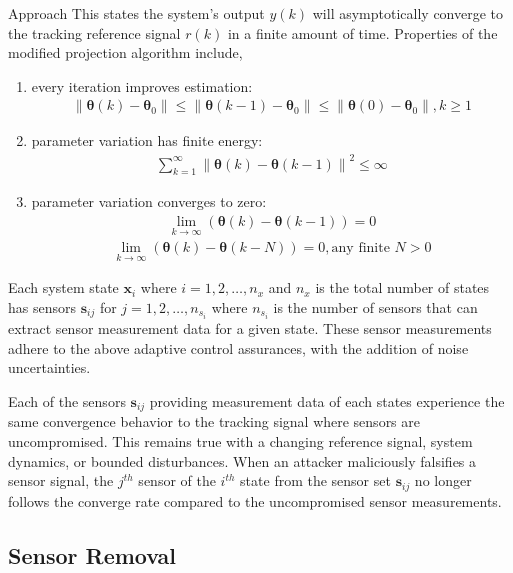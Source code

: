 \begin{section}{Approach}
This states the system's output $y(k)$ will asymptotically converge to the tracking reference signal $r(k)$ in a finite amount of time. Properties of the modified projection algorithm include,
    \begin{enumerate}[label=(\roman*),leftmargin=3\parindent]
	\item every iteration improves estimation:
	    \begin{align}
	        \|\bm{\theta}(k)-\bm{\theta}_0\|\leq\|\bm{\theta}(k-1)-\bm{\theta}_0\|\leq\|\bm{\theta}(0)-\bm{\theta}_0\|, k\geq1 \nonumber
	    \end{align}
	\item parameter variation has finite energy:
	    \begin{align}
	        \sum_{k=1}^\infty{\|\bm{\theta}(k)-\bm{\theta}(k-1)\|}^2\leq \infty \nonumber
	    \end{align}
	\item parameter variation converges to zero:
	    \begin{align}
	        \lim_{k\to\infty}(\bm{\theta}(k)-\bm{\theta}(k-1))=0 \nonumber
	    \end{align}
	    \begin{align}
	        \lim_{k\to\infty}(\bm{\theta}(k)-\bm{\theta}(k-N))=0, \text{any finite } N>0 \nonumber
	    \end{align}
	\end{enumerate}

Each system state $\bm{x}_i$ where $i=1,2,\dots,n_x$ and $n_x$ is the total number of states has sensors $\bm{s}_{ij}$ for $j=1,2,\dots,n_{s_i}$ where $n_{s_i}$ is the number of sensors that can extract sensor measurement data for a given state. These sensor measurements adhere to the above adaptive control assurances, with the addition of noise uncertainties.

Each of the sensors $\bm{s}_{ij}$ providing measurement data of each states experience the same convergence behavior to the tracking signal where sensors are uncompromised. This remains true with a changing reference signal, system dynamics, or bounded disturbances. When an attacker maliciously falsifies a sensor signal, the $j^{th}$ sensor of the $i^{th}$ state from the sensor set $\bm{s}_{ij}$ no longer follows the converge rate compared to the uncompromised sensor measurements. 

\subsection{Sensor Removal}


\end{section}
